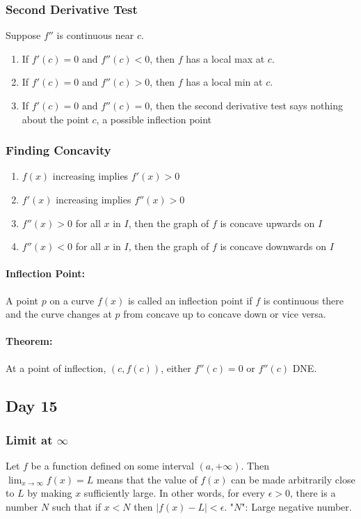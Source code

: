 \documentclass[12pt]{article}
\begin{document}
\subsubsection{Second Derivative Test} Suppose $f''$ is continuous near $c$. 
\begin{enumerate}
    \item If $f'(c) = 0$ and $f''(c) < 0$, then $f$ has a local max at $c$.
    \item If $f'(c) = 0$ and $f''(c) > 0$, then $f$ has a local min at $c$.
    \item If $f'(c) = 0$ and $f''(c) = 0$, then the second derivative test says nothing about the point $c$, a possible inflection point
\end{enumerate}
\subsubsection{Finding Concavity}
\begin{enumerate}
    \item $f(x)$ increasing implies $f'(x)>0$
    \item $f'(x)$ increasing implies $f''(x)>0$
    \item $f''(x)>0$ for all $x$ in $I$, then the graph of $f$ is concave upwards on $I$
    \item $f''(x)<0$ for all $x$ in $I$, then the graph of $f$ is concave downwards on $I$
\end{enumerate}

\paragraph{Inflection Point:} A point $p$ on a curve $f(x)$ is called an inflection point if $f$ is continuous there and the curve changes at $p$ from concave up to concave down or vice versa.

\paragraph{Theorem:} At a point of inflection, $(c, f(c))$, either $f''(c)=0$ or $f''(c)$ DNE.

\subsection{Day 15}
\subsubsection{Limit at $\infty{}$} Let $f$ be a function defined on some interval $(a, +\infty{})$. Then $\lim_{x \to \infty{}} f(x) = L$ means that the value of $f(x)$ can be made arbitrarily close to $L$ by making $x$ sufficiently large. In other words, for every $\epsilon > 0$, there is a number $N$ such that if $x<N$ then $|f(x)-L| < \epsilon$. "$N$": Large negative number.
\end{document}
